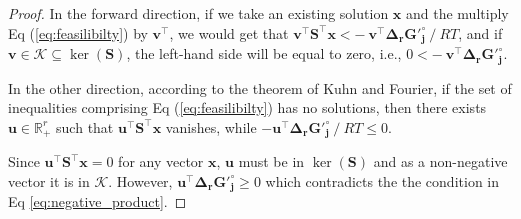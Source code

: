 \documentclass[12pt]{article}
\begin{document}
\begin{proof}
In the forward direction, if we take an existing solution $\mathbf{x}$ and the multiply Eq (\ref{eq:feasilibilty}) by $\mathbf{v}^\top$, we would get that
$\mathbf{v}^\top \mathbf{S}^\top \mathbf{x} < -~\mathbf{v}^\top \mathbf{\Delta_r G'^\circ_j}~/~RT$, and if $\mathbf{v} \in \mathcal{K} \subseteq \ker(\mathbf{S})$, the left-hand side will be equal to zero, i.e., $0 < -~\mathbf{v}^\top \mathbf{\Delta_r G'^\circ_j}$.

In the other direction, according to the theorem of Kuhn and Fourier, if the set of inequalities comprising Eq (\ref{eq:feasilibilty}) has no solutions, then there exists $\mathbf{u} \in \mathbb{R}_+^r$ such that $\mathbf{u}^\top \mathbf{S}^\top \mathbf{x}$ vanishes, while $-\mathbf{u}^\top \mathbf{\Delta_r G'^\circ_j}~/~RT \le 0$.

Since $\mathbf{u}^\top \mathbf{S}^\top \mathbf{x} = 0$ for any vector $\mathbf{x}$, $\mathbf{u}$ must be in $\ker(\mathbf{S})$ and as a non-negative vector it is in $\mathcal{K}$. However, $\mathbf{u}^\top \mathbf{\Delta_r G'^\circ_j} \ge 0$ which contradicts the the condition in Eq \ref{eq:negative_product}.
\end{proof}

 
\end{document}
